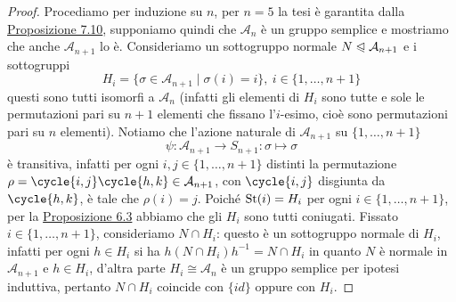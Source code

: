 \documentclass[11pt]{scrartcl}
\begin{document}
\begin{proof}
    Procediamo per induzione su $n$, per $n = 5$ la tesi è garantita dalla 
    \hyperref[prop3.0]{Proposizione 7.10}, supponiamo quindi che $\mathcal{A}_n$
    è un gruppo semplice e mostriamo che anche $\mathcal{A}_{n + 1}$ lo è.
    Consideriamo un sottogruppo normale $N \trianglelefteqslant \mathcal{A}_{n + 1}$
    e i sottogruppi 
    \[
        H_i = \{\sigma \in \mathcal{A}_{n + 1}\mid \sigma(i) = i\},~
        i \in \{1, \ldots, n + 1\}
    \]
    questi sono tutti isomorfi a $\mathcal{A}_n$ (infatti
    gli elementi di $H_i$ sono tutte e sole le permutazioni pari su $n + 1$
    elementi che fissano l'$i$-esimo, cioè sono permutazioni pari su $n$ elementi).
    Notiamo che l'azione naturale di $\mathcal{A}_{n + 1}$ su $\{1, \ldots, n + 1\}$
    \[
        \psi:\mathcal{A}_{n + 1} \longrightarrow S_{n + 1} :\sigma \longmapsto \sigma
    \]
    è transitiva, infatti per ogni $i, j \in \{1, \ldots, n + 1\}$ distinti la permutazione
    $\rho = \cycle{i, j}\cycle{h, k} \in \mathcal{A}_{n + 1}$, con $\cycle{i, j}$
    disgiunta da $\cycle{h, k}$, è tale che $\rho(i) = j$. Poiché $\operatorname{St}(i) = H_i$ per ogni $i \in \{1, \ldots, n + 1\}$,
    per la \hyperref[prop1.0]{Proposizione 6.3} abbiamo che gli $H_i$ sono 
    tutti coniugati.\newline
    Fissato $i \in \{1, \ldots, n + 1\}$, consideriamo $N \cap H_i$: questo
    è un sottogruppo normale di $H_i$, infatti per ogni $h \in H_i$ si ha 
    $h(N\cap H_i)h^{-1} = N\cap H_i$ in quanto $N$ è normale in $\mathcal{A}_{n + 1}$
    e $h \in H_i$, d'altra parte $H_i \cong \mathcal{A}_n$ è un gruppo semplice
    per ipotesi induttiva, pertanto $N\cap H_i$ coincide con $\{id\}$ oppure 
    con $H_i$.
\end{proof}
\end{document}
